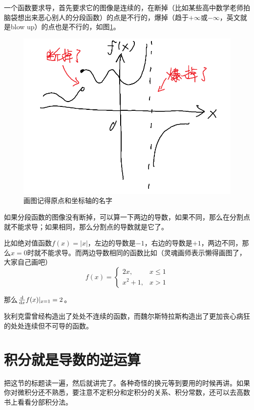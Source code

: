 一个函数要求导，首先要求它的图像是连续的，在断掉（比如某些高中数学老师拍脑袋想出来恶心别人的分段函数）的点是不行的，爆掉（趋于$+\infty$或$-\infty$，英文就是blow up）的点也是不行的，如图\ref{fig-bad-deri}。
\begin{figure}[htb]
\centering
\includegraphics[scale=0.5]{fig/bad-deri.png}
\caption{画图记得原点和坐标轴的名字}
\label{fig-bad-deri}
\end{figure}

如果分段函数的图像没有断掉，可以算一下两边的导数，如果不同，那么在分割点就不能求导；如果相同，那么分割点的导数就是它了。

比如绝对值函数$f(x)=|x|$，左边的导数是$-1$，右边的导数是$+1$，两边不同，那么$x=0$时就不能求导。而两边导数相同的函数比如（灵魂画师表示懒得画图了，大家自己画吧）
\begin{equation*}
f(x)=
\begin{cases}
2x, &x \le 1 \\
x^2+1, &x>1
\end{cases}
\end{equation*}

那么$\frac{\mathop{}\!\mathrm{d}}{\mathop{}\!\mathrm{d} x} f(x)|_{x=1}=2$。

狄利克雷曾经构造出了处处不连续的函数，而魏尔斯特拉斯构造出了更加丧心病狂的处处连续但不可导的函数。
\section{积分就是导数的逆运算}
把这节的标题读一遍，然后就讲完了。各种奇怪的换元等到要用的时候再讲。如果你对微积分还不熟悉，要注意不定积分和定积分的关系、积分常数，还可以去高数书上看看分部积分法。

